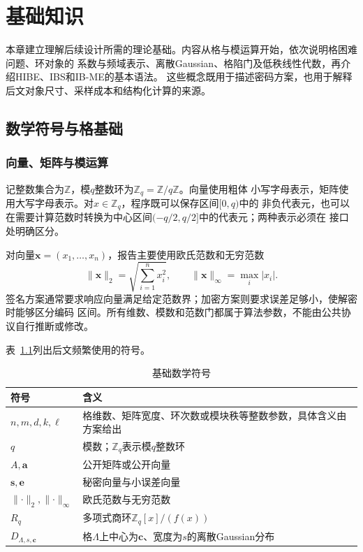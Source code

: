 \chapter{基础知识}

本章建立理解后续设计所需的理论基础。内容从格与模运算开始，依次说明格困难问题、环对象的
系数与频域表示、离散Gaussian、格陷门及低秩线性代数，再介绍HIBE、IBS和IB-ME的基本语法。
这些概念既用于描述密码方案，也用于解释后文对象尺寸、采样成本和结构化计算的来源。

\section{数学符号与格基础}

\subsection{向量、矩阵与模运算}

记整数集合为$\mathbb Z$，模$q$整数环为$\mathbb Z_q=\mathbb Z/q\mathbb Z$。向量使用粗体
小写字母表示，矩阵使用大写字母表示。对$x\in\mathbb Z_q$，程序既可以保存区间$[0,q)$中的
非负代表元，也可以在需要计算范数时转换为中心区间$(-q/2,q/2]$中的代表元；两种表示必须在
接口处明确区分。

对向量$\mathbf x=(x_1,\ldots,x_n)$，报告主要使用欧氏范数和无穷范数
\[
 \lVert\mathbf x\rVert_2=\sqrt{\sum_{i=1}^{n}x_i^2},
 \qquad
 \lVert\mathbf x\rVert_\infty=\max_i|x_i|.
\]
签名方案通常要求响应向量满足给定范数界；加密方案则要求误差足够小，使解密时能够区分编码
区间。所有维数、模数和范数门都属于算法参数，不能由公共协议自行推断或修改。

表~\ref{tab:foundation-symbols}列出后文频繁使用的符号。

\begin{table}[H]
\centering\small
\caption{基础数学符号}
\label{tab:foundation-symbols}
\begin{tabularx}{\textwidth}{@{}p{}X@{}}
\toprule
\rowcolor{black!8} 符号 & 含义 \\
\midrule
$n,m,d,k,\ell$ & 格维数、矩阵宽度、环次数或模块秩等整数参数，具体含义由方案给出 \\
$q$ & 模数；$\mathbb Z_q$表示模$q$整数环 \\
$A,\mathbf a$ & 公开矩阵或公开向量 \\
$\mathbf s,\mathbf e$ & 秘密向量与小误差向量 \\
$\lVert\cdot\rVert_2,\lVert\cdot\rVert_\infty$ & 欧氏范数与无穷范数 \\
$R_q$ & 多项式商环$\mathbb Z_q[x]/(f(x))$ \\
$D_{\Lambda,s,\mathbf c}$ & 格$\Lambda$上中心为$\mathbf c$、宽度为$s$的离散Gaussian分布 \\
\bottomrule
\end{tabularx}
\end{table}

